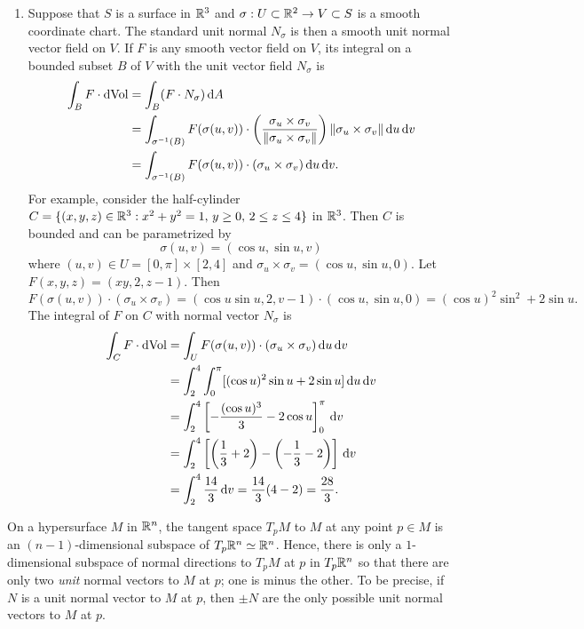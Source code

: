 \begin{enumerate}[(1)]
    \item Suppose that $S$ is a surface in $\mathbb{R}^3$ and $\sigma : U 
    \subset \mathbb{R}^2 \to V \subset S$ is a smooth coordinate chart. The 
    standard unit normal $N_\sigma$ is then a smooth unit normal vector 
    field on $V$. If $F$ is any smooth vector field on $V$, its integral 
    on a bounded subset $B$ of $V$ with the unit vector field $N_\sigma$ is 
    \begin{align*}
        \int_B F \cdot \operatorname{dVol} 
        &= \int_B (F \cdot N_\sigma)\,\mathrm{d} A \\ 
        &= \int_{\sigma^{-1}(B)} F(\sigma(u, v)) \cdot 
        \left( \frac{\sigma_u \times \sigma_v}{\|\sigma_u \times \sigma_v\|} 
        \right) \|\sigma_u \times \sigma_v\|\,\mathrm{d} u \,\mathrm{d} v \\ 
        &= \int_{\sigma^{-1}(B)} F(\sigma(u, v)) \cdot (\sigma_u \times \sigma_v)\,\mathrm{d} u \,\mathrm{d} v.
    \end{align*}
    For example, consider the half-cylinder $C = \{(x, y, z) \in \mathbb{R}^3 : 
    x^2+y^2=1,\,y\geq 0,\,2\leq z \leq 4\}$ in $\mathbb{R}^3$. Then $C$ is bounded 
    and can be parametrized by 
    \[ \sigma(u, v) = (\cos u, \sin u, v) \] 
    where $(u, v) \in U = [0, \pi] \times [2, 4]$ and $\sigma_u \times \sigma_v 
    = (\cos u, \sin u, 0)$. Let $F(x, y, z) = (xy, 2, z-1)$. Then 
    \[ F(\sigma(u, v)) \cdot (\sigma_u \times \sigma_v) = 
    (\cos u \sin u, 2, v-1) \cdot (\cos u, \sin u, 0) = (\cos u)^2 \sin^2 + 2\sin u. \] 
    The integral of $F$ on $C$ with normal vector $N_\sigma$ is 
    \begin{align*}
        \int_C F \cdot \operatorname{dVol} 
        &= \int_U F(\sigma(u, v)) \cdot (\sigma_u \times \sigma_v)\,\mathrm{d} u\,\mathrm{d} v \\ 
        &= \int_2^4 \int_0^\pi [(\cos u)^2 \sin u + 2\sin u] \,\mathrm{d} u \,\mathrm{d} v \\ 
        &= \int_2^4 \left[ -\frac{(\cos u)^3}{3} - 2\cos u \right]_0^\pi \,\mathrm{d} v \\ 
        &= \int_2^4 \left[ \left( \frac13 + 2 \right) - \left(-\frac13 - 2\right) \right] \,\mathrm{d} v \\ 
        &= \int_2^4 \frac{14}{3} \,\mathrm{d} v = \frac{14}{3}(4-2) = \frac{28}{3}. 
    \end{align*}

\end{enumerate}

On a hypersurface $M$ in $\mathbb{R}^n$, the tangent space $T_pM$ to $M$ at any point 
$p \in M$ is an $(n-1)$-dimensional subspace of $T_p\mathbb{R}^n \simeq \mathbb{R}^n$. 
Hence, there is only a $1$-dimensional subspace of normal directions to $T_pM$ 
at $p$ in $T_p\mathbb{R}^n$ so that there are only two \emph{unit} normal vectors 
to $M$ at $p$; one is minus the other. To be precise, if $N$ is a unit 
normal vector to $M$ at $p$, then $\pm N$ are the only possible unit 
normal vectors to $M$ at $p$. 


